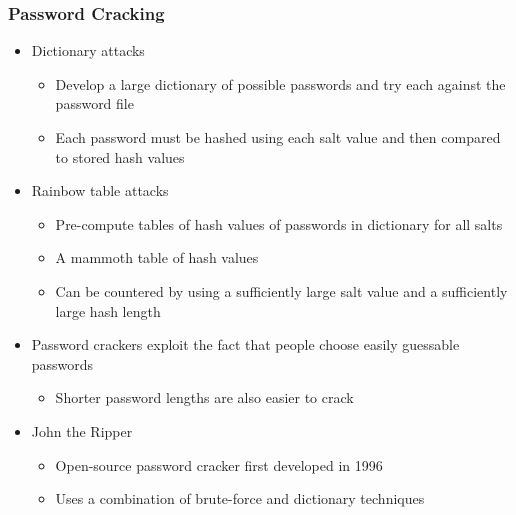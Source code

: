 \documentclass{article}
\begin{document}
        \subsubsection{Password Cracking}
        \begin{itemize}
            \item Dictionary attacks
            \begin{itemize}
                \item Develop a large dictionary of possible passwords and try each against the password file
                \item Each password must be hashed using each salt value and then compared to stored hash values
            \end{itemize}
            \item Rainbow table attacks
            \begin{itemize}
                \item Pre-compute tables of hash values of passwords in dictionary for all salts
                \item A mammoth table of hash values
                \item Can be countered by using a sufficiently large salt value and a sufficiently large hash length
            \end{itemize}
            \item Password crackers exploit the fact that people choose easily guessable passwords
            \begin{itemize}
                \item Shorter password lengths are also easier to crack
            \end{itemize}
            \item John the Ripper
            \begin{itemize}
                \item Open-source password cracker first developed in 1996
                \item Uses a combination of brute-force and dictionary techniques
            \end{itemize}
        \end{itemize}
\end{document}
